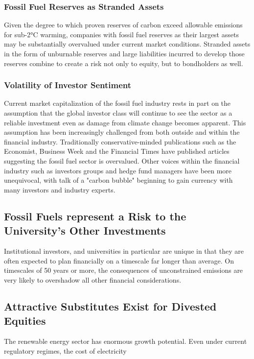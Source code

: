 \subsubsection {Fossil Fuel Reserves as Stranded Assets} 

Given the degree to which proven reserves of carbon exceed allowable emissions for sub-2°C warming, companies with fossil fuel reserves as their largest assets may be substantially overvalued under current market conditions. Stranded assets in the form of unburnable reserves and large liabilities incurred to develop those reserves combine to create a risk not only to equity, but to bondholders as well.

\subsubsection {Volatility of Investor Sentiment}

Current market capitalization of the fossil fuel industry rests in part on the assumption that the global investor class will continue to see the sector as a reliable investment even as damage from climate change becomes apparent. This assumption has been increasingly challenged from both outside and within the financial industry. Traditionally conservative-minded publications such as the Economist, Business Week and the Financial Times have published articles suggesting the fossil fuel sector is overvalued. Other voices within the financial industry such as investors groups and hedge fund managers have been more unequivocal, with talk of a "carbon bubble" beginning to gain currency with many investors and industry experts. 

\subsection {Fossil Fuels represent a Risk to the University's Other Investments}

Institutional investors, and universities in particular are unique in that they are often expected to plan financially on a timescale far longer than average. On timescales of 50 years or more, the consequences of unconstrained emissions are very likely to overshadow all other financial considerations.

\subsection {Attractive Substitutes Exist for Divested Equities}

The renewable energy sector has enormous growth potential. Even under current regulatory regimes, the cost of electricity 	
 
		